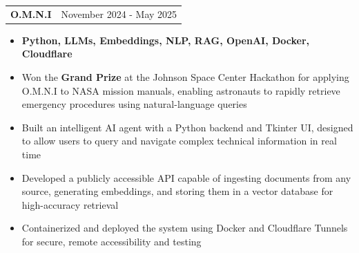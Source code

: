 \documentclass[letterpaper,11pt]{article}
\makeatletter
\newcommand{\resumeItem}[1]{
  \item\small{
    {#1 \vspace{-2pt}}
  }
}
\newcommand{\resumeProjectHeading}[2]{
    \item
    \begin{tabular*}{0.97\textwidth}{l@{\extracolsep{\fill}}r}
      \small#1 & #2 \\
    \end{tabular*}\vspace{-8pt}
}
\newcommand{\resumeItemListStart}{\begin{itemize}}
\newcommand{\resumeItemListEnd}{\end{itemize}\vspace{-6pt}}
\makeatother
\begin{document}

\resumeProjectHeading
{\textbf{O.M.N.I}}{November 2024 - May 2025}
\resumeItemListStart
\resumeItem{ \textbf{Python, LLMs, Embeddings, NLP, RAG, OpenAI, Docker, Cloudflare}}
\resumeItem{Won the \textbf{Grand Prize} at the Johnson Space Center Hackathon for applying O.M.N.I to NASA mission manuals, enabling astronauts to rapidly retrieve emergency procedures using natural-language queries}
\resumeItem{Built an intelligent AI agent with a Python backend and Tkinter UI, designed to allow users to query and navigate complex technical information in real time}
\resumeItem{Developed a publicly accessible API capable of ingesting documents from any source, generating embeddings, and storing them in a vector database for high-accuracy retrieval}
\resumeItem{Containerized and deployed the system using Docker and Cloudflare Tunnels for secure, remote accessibility and testing}
\resumeItemListEnd \vspace{-5pt}


\end{document}
